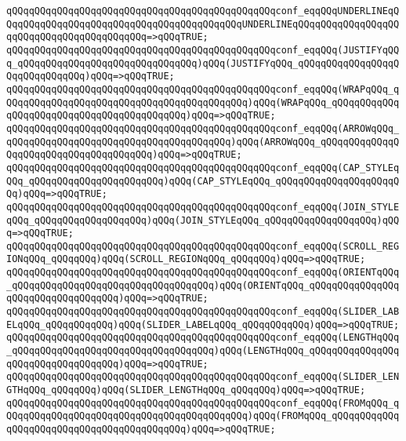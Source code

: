 \verb|qQQqqQQqqQQqqQQqqQQqqQQqqQQqqQQqqQQqqQQqqQQqqQQqconf_eqqQQqUNDERLINEqQQqqQQqqQQqqQQqqQQqqQQqqQQqqQQqqQQqqQQqqQQqUNDERLINEqQQqqQQqqQQqqQQqqQQqqQQqqQQqqQQqqQQqqQQqqQQq=>qQQqTRUE;|\newline
\verb|qQQqqQQqqQQqqQQqqQQqqQQqqQQqqQQqqQQqqQQqqQQqqQQqconf_eqqQQq(JUSTIFYqQQq_qQQqqQQqqQQqqQQqqQQqqQQqqQQqqQQq)qQQq(JUSTIFYqQQq_qQQqqQQqqQQqqQQqqQQqqQQqqQQqqQQq)qQQq=>qQQqTRUE;|\newline
\verb|qQQqqQQqqQQqqQQqqQQqqQQqqQQqqQQqqQQqqQQqqQQqqQQqconf_eqqQQq(WRAPqQQq_qQQqqQQqqQQqqQQqqQQqqQQqqQQqqQQqqQQqqQQqqQQq)qQQq(WRAPqQQq_qQQqqQQqqQQqqQQqqQQqqQQqqQQqqQQqqQQqqQQqqQQq)qQQq=>qQQqTRUE;|\newline
\verb|qQQqqQQqqQQqqQQqqQQqqQQqqQQqqQQqqQQqqQQqqQQqqQQqconf_eqqQQq(ARROWqQQq_qQQqqQQqqQQqqQQqqQQqqQQqqQQqqQQqqQQqqQQq)qQQq(ARROWqQQq_qQQqqQQqqQQqqQQqqQQqqQQqqQQqqQQqqQQqqQQq)qQQq=>qQQqTRUE;|\newline
\verb|qQQqqQQqqQQqqQQqqQQqqQQqqQQqqQQqqQQqqQQqqQQqqQQqconf_eqqQQq(CAP_STYLEqQQq_qQQqqQQqqQQqqQQqqQQqqQQq)qQQq(CAP_STYLEqQQq_qQQqqQQqqQQqqQQqqQQqqQQq)qQQq=>qQQqTRUE;|\newline
\verb|qQQqqQQqqQQqqQQqqQQqqQQqqQQqqQQqqQQqqQQqqQQqqQQqconf_eqqQQq(JOIN_STYLEqQQq_qQQqqQQqqQQqqQQqqQQq)qQQq(JOIN_STYLEqQQq_qQQqqQQqqQQqqQQqqQQq)qQQq=>qQQqTRUE;|\newline
\verb|qQQqqQQqqQQqqQQqqQQqqQQqqQQqqQQqqQQqqQQqqQQqqQQqconf_eqqQQq(SCROLL_REGIONqQQq_qQQqqQQq)qQQq(SCROLL_REGIONqQQq_qQQqqQQq)qQQq=>qQQqTRUE;|\newline
\verb|qQQqqQQqqQQqqQQqqQQqqQQqqQQqqQQqqQQqqQQqqQQqqQQqconf_eqqQQq(ORIENTqQQq_qQQqqQQqqQQqqQQqqQQqqQQqqQQqqQQqqQQq)qQQq(ORIENTqQQq_qQQqqQQqqQQqqQQqqQQqqQQqqQQqqQQqqQQq)qQQq=>qQQqTRUE;|\newline
\verb|qQQqqQQqqQQqqQQqqQQqqQQqqQQqqQQqqQQqqQQqqQQqqQQqconf_eqqQQq(SLIDER_LABELqQQq_qQQqqQQqqQQq)qQQq(SLIDER_LABELqQQq_qQQqqQQqqQQq)qQQq=>qQQqTRUE;|\newline
\verb|qQQqqQQqqQQqqQQqqQQqqQQqqQQqqQQqqQQqqQQqqQQqqQQqconf_eqqQQq(LENGTHqQQq_qQQqqQQqqQQqqQQqqQQqqQQqqQQqqQQqqQQq)qQQq(LENGTHqQQq_qQQqqQQqqQQqqQQqqQQqqQQqqQQqqQQqqQQq)qQQq=>qQQqTRUE;|\newline
\verb|qQQqqQQqqQQqqQQqqQQqqQQqqQQqqQQqqQQqqQQqqQQqqQQqconf_eqqQQq(SLIDER_LENGTHqQQq_qQQqqQQq)qQQq(SLIDER_LENGTHqQQq_qQQqqQQq)qQQq=>qQQqTRUE;|\newline
\verb|qQQqqQQqqQQqqQQqqQQqqQQqqQQqqQQqqQQqqQQqqQQqqQQqconf_eqqQQq(FROMqQQq_qQQqqQQqqQQqqQQqqQQqqQQqqQQqqQQqqQQqqQQqqQQq)qQQq(FROMqQQq_qQQqqQQqqQQqqQQqqQQqqQQqqQQqqQQqqQQqqQQqqQQq)qQQq=>qQQqTRUE;|\newline
